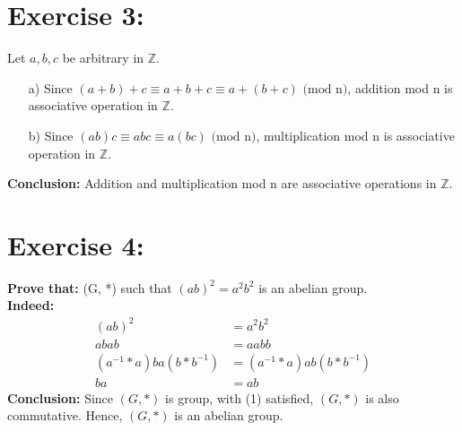 \documentclass{article}
\newcommand{\Z}{\mathbb{Z}}
\begin{document}
	\section{Exercise 3:}
		Let $a, b, c$ be arbitrary in $\Z$.
		\begin{enumerate}
			\item [a)] Since $(a+b)+c \equiv a+b+c \equiv a+(b+c) \mbox{ (mod n)}$, addition mod n is associative operation in $\Z$.
			\item [b)] Since $(ab)c \equiv abc \equiv a(bc) \mbox{ (mod n)}$, multiplication mod n is associative operation in $\Z$.
		\end{enumerate}
		\textbf{Conclusion:} Addition and multiplication mod n are associative operations in $\Z$.
		
	\section{Exercise 4:}
		\textbf{Prove that:} (G, *) such that $(ab)^2 =a^2b^2$ is an abelian group.\\
		\textbf{Indeed:}
		\begin{align*}
			(ab)^2 &= a^2b^2\\
			abab &= aabb\\
			(a^{-1}*a)ba(b*b^{-1}) &= (a^{-1}*a)ab(b*b^{-1})\\
			ba &= ab\tag{1}
		\end{align*}
		\textbf{Conclusion:} Since $(G, *)$ is group, with (1) satisfied, $(G, *)$ is also commutative. Hence, $(G, *)$ is an abelian group.
	
\end{document}
